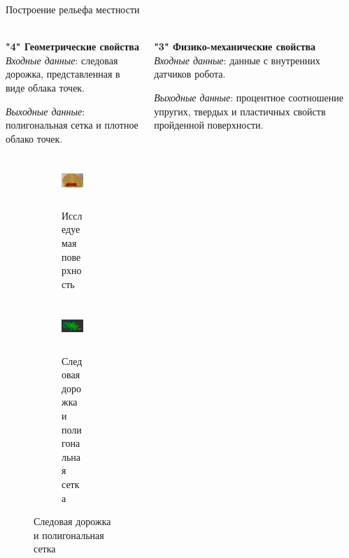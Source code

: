 \begin{frame}[t]{Построение рельефа местности}
    \framesubtitle{}
    \begin{columns}[T,onlytextwidth]
        \begin{column}{0.49\textwidth}
            \textbf{"4" Геометрические свойства}\\
            \textit{Входные данные}: следовая дорожка, представленная в виде облака точек.

            \textit{Выходные данные}: полигональная сетка и плотное облако точек.
            \vspace{0.35cm}
            \begin{figure}[H]
                \begin{subfigure}[t]{0.49\textwidth}
                    \centering\includegraphics[height=1.9cm,width=1\textwidth,keepaspectratio]{../images/slides/surface_research.png}
                    \caption*{Исследуемая поверхность}
                \end{subfigure}
                \begin{subfigure}[t]{0.49\textwidth}
                    \centering\includegraphics[height=1.9cm,width=1\textwidth,keepaspectratio]{../images/slides/result_research.png}
                    \caption*{Следовая дорожка и полигональная сетка}
                \end{subfigure}
            \end{figure}
        \end{column}
        \begin{column}{0.49\textwidth}
            \textbf{"3" Физико-механические свойства}\\
            \textit{Входные данные}: данные с внутренних датчиков робота.

            \textit{Выходные данные}: процентное соотношение упругих, твердых и пластичных свойств пройденной поверхности.


\end{column}
\end{columns}
\end{frame}
